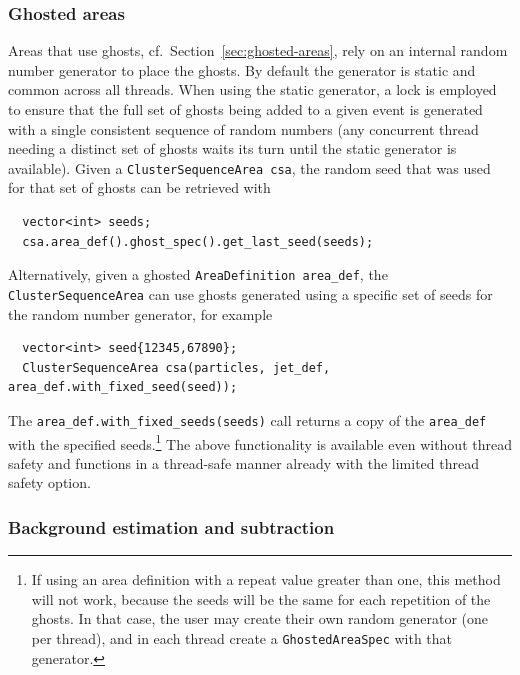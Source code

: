 \documentclass[12pt,a4]{article}
\newcommand{\ttt}[1]{{\small\texttt{#1}}}
\begin{document}
\subsubsection{Ghosted areas}
\label{sec:threads-ghosted-areas}
%
Areas that use ghosts, cf.\ Section~\ref{sec:ghosted-areas}, rely on
an internal random number generator to place the ghosts.
%
By default the generator is static and common across all threads.
%
When using the static generator, a lock is employed to ensure that the
full set of ghosts being added to a given event is generated with a
single consistent sequence of random numbers (any concurrent thread
needing a distinct set of ghosts waits its turn until the static
generator is available). 
%
Given a \ttt{ClusterSequenceArea csa}, the random seed that was used
for that set of ghosts can be retrieved with 
\begin{lstlisting}
  vector<int> seeds;
  csa.area_def().ghost_spec().get_last_seed(seeds);
\end{lstlisting}
Alternatively, given a ghosted \ttt{AreaDefinition area\_def}, the
\ttt{ClusterSequenceArea} can use ghosts generated using a specific
set of seeds for the random number generator, for example
\begin{lstlisting}
  vector<int> seed{12345,67890};
  ClusterSequenceArea csa(particles, jet_def, area_def.with_fixed_seed(seed));
\end{lstlisting}
The \ttt{area\_def.with\_fixed\_seeds(seeds)} call returns a copy of
the \ttt{area\_def} with the specified seeds.\footnote{If using an
  area definition with a repeat value greater than one, this method
  will not work, because the seeds will be the same for each
  repetition of the ghosts.
  In that case, the user may create their own random generator (one
  per thread), and in each thread create a \ttt{GhostedAreaSpec} with
  that generator. 
}
%
The above functionality is available even without thread safety and
functions in a thread-safe manner already with the limited thread
safety option.

\subsubsection{Background estimation and subtraction}
\label{sec:threads-backgr-estim-subtr}
\end{document}

